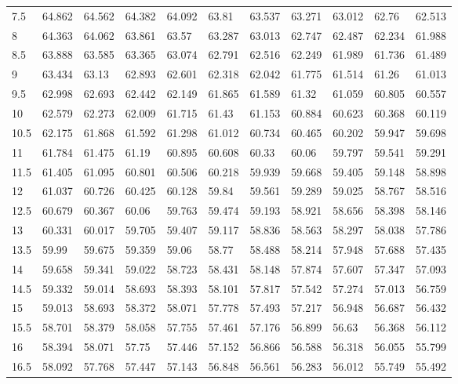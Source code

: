 \begin{bibunit}
\begin{table}[]
\begin{tabular}{lllllllllll}
				7.5  & 64.862 & 64.562 & 64.382 & 64.092 & 63.81  & 63.537 & 63.271 & 63.012 & 62.76  & 62.513 \\
				8    & 64.363 & 64.062 & 63.861 & 63.57  & 63.287 & 63.013 & 62.747 & 62.487 & 62.234 & 61.988 \\
				8.5  & 63.888 & 63.585 & 63.365 & 63.074 & 62.791 & 62.516 & 62.249 & 61.989 & 61.736 & 61.489 \\
				9    & 63.434 & 63.13  & 62.893 & 62.601 & 62.318 & 62.042 & 61.775 & 61.514 & 61.26  & 61.013 \\
				9.5  & 62.998 & 62.693 & 62.442 & 62.149 & 61.865 & 61.589 & 61.32  & 61.059 & 60.805 & 60.557 \\
				10   & 62.579 & 62.273 & 62.009 & 61.715 & 61.43  & 61.153 & 60.884 & 60.623 & 60.368 & 60.119 \\
				10.5 & 62.175 & 61.868 & 61.592 & 61.298 & 61.012 & 60.734 & 60.465 & 60.202 & 59.947 & 59.698 \\
				11   & 61.784 & 61.475 & 61.19  & 60.895 & 60.608 & 60.33  & 60.06  & 59.797 & 59.541 & 59.291 \\
				11.5 & 61.405 & 61.095 & 60.801 & 60.506 & 60.218 & 59.939 & 59.668 & 59.405 & 59.148 & 58.898 \\
				12   & 61.037 & 60.726 & 60.425 & 60.128 & 59.84  & 59.561 & 59.289 & 59.025 & 58.767 & 58.516 \\
				12.5 & 60.679 & 60.367 & 60.06  & 59.763 & 59.474 & 59.193 & 58.921 & 58.656 & 58.398 & 58.146 \\
				13   & 60.331 & 60.017 & 59.705 & 59.407 & 59.117 & 58.836 & 58.563 & 58.297 & 58.038 & 57.786 \\
				13.5 & 59.99  & 59.675 & 59.359 & 59.06  & 58.77  & 58.488 & 58.214 & 57.948 & 57.688 & 57.435 \\
				14   & 59.658 & 59.341 & 59.022 & 58.723 & 58.431 & 58.148 & 57.874 & 57.607 & 57.347 & 57.093 \\
				14.5 & 59.332 & 59.014 & 58.693 & 58.393 & 58.101 & 57.817 & 57.542 & 57.274 & 57.013 & 56.759 \\
				15   & 59.013 & 58.693 & 58.372 & 58.071 & 57.778 & 57.493 & 57.217 & 56.948 & 56.687 & 56.432 \\
				15.5 & 58.701 & 58.379 & 58.058 & 57.755 & 57.461 & 57.176 & 56.899 & 56.63  & 56.368 & 56.112 \\
				16   & 58.394 & 58.071 & 57.75  & 57.446 & 57.152 & 56.866 & 56.588 & 56.318 & 56.055 & 55.799 \\
				16.5 & 58.092 & 57.768 & 57.447 & 57.143 & 56.848 & 56.561 & 56.283 & 56.012 & 55.749 & 55.492 \\

\end{tabular}
\end{table}
\end{bibunit}
